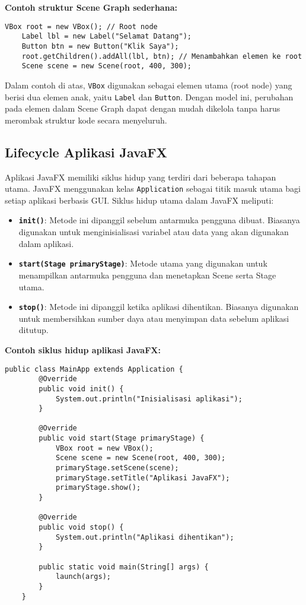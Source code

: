 \textbf{Contoh struktur Scene Graph sederhana:}
\begin{lstlisting}[style=JavaStyle, caption=Contoh Scene Graph dalam JavaFX]
	VBox root = new VBox(); // Root node
	Label lbl = new Label("Selamat Datang");
	Button btn = new Button("Klik Saya");
	root.getChildren().addAll(lbl, btn); // Menambahkan elemen ke root
	Scene scene = new Scene(root, 400, 300);
\end{lstlisting}

Dalam contoh di atas, \texttt{VBox} digunakan sebagai elemen utama (root node) yang berisi dua elemen anak, yaitu \texttt{Label} dan \texttt{Button}. Dengan model ini, perubahan pada elemen dalam Scene Graph dapat dengan mudah dikelola tanpa harus merombak struktur kode secara menyeluruh.

\subsection{Lifecycle Aplikasi JavaFX}

Aplikasi JavaFX memiliki siklus hidup yang terdiri dari beberapa tahapan utama. JavaFX menggunakan kelas \texttt{Application} sebagai titik masuk utama bagi setiap aplikasi berbasis GUI. Siklus hidup utama dalam JavaFX meliputi:

\begin{itemize}
	\item \textbf{\texttt{init()}}: Metode ini dipanggil sebelum antarmuka pengguna dibuat. Biasanya digunakan untuk menginisialisasi variabel atau data yang akan digunakan dalam aplikasi.
	\item \textbf{\texttt{start(Stage primaryStage)}}: Metode utama yang digunakan untuk menampilkan antarmuka pengguna dan menetapkan Scene serta Stage utama.
	\item \textbf{\texttt{stop()}}: Metode ini dipanggil ketika aplikasi dihentikan. Biasanya digunakan untuk membersihkan sumber daya atau menyimpan data sebelum aplikasi ditutup.
\end{itemize}

\textbf{Contoh siklus hidup aplikasi JavaFX:}
\begin{lstlisting}[style=JavaStyle, caption=Contoh siklus hidup JavaFX]
	public class MainApp extends Application {
		@Override
		public void init() {
			System.out.println("Inisialisasi aplikasi");
		}
		
		@Override
		public void start(Stage primaryStage) {
			VBox root = new VBox();
			Scene scene = new Scene(root, 400, 300);
			primaryStage.setScene(scene);
			primaryStage.setTitle("Aplikasi JavaFX");
			primaryStage.show();
		}
		
		@Override
		public void stop() {
			System.out.println("Aplikasi dihentikan");
		}
		
		public static void main(String[] args) {
			launch(args);
		}
	}
\end{lstlisting}


